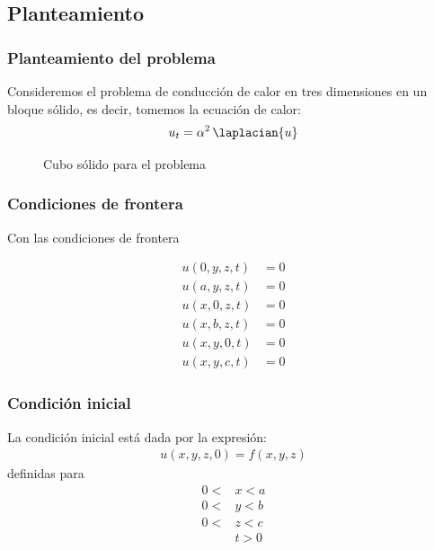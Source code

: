 \subsection{Planteamiento}
\begin{frame}
\frametitle{Planteamiento del problema}
Consideremos el problema de conducción de calor en tres dimensiones en un bloque sólido, es decir, tomemos la ecuación de calor:
\begin{align}
u_{t} = \alpha^{2} \, \laplacian{u}
\label{eq:ecuacion_02_214}
\end{align}
\begin{figure}
    \centering
    
    \caption{Cubo sólido para el problema}
\end{figure}
\end{frame}
\begin{frame}
\frametitle{Condiciones de frontera}
Con las condiciones de frontera
\\
\begin{minipage}{0.4\textwidth}
\begin{figure}
    \centering
    
\end{figure}
\end{minipage}
\hspace{1cm}
\begin{minipage}{0.4\textwidth}
\begin{align}
u(0, y, z, t) &= 0 \label{eq:ecuacion_0215} \\ 
u(a, y, z, t) &= 0 \label{eq:ecuacion_0216} \\ 
u(x, 0, z, t) &= 0 \label{eq:ecuacion_0217} \\
u(x, b, z, t) &= 0 \label{eq:ecuacion_0218} \\
u(x, y, 0, t) &= 0 \label{eq:ecuacion_0219} \\
u(x, y, c, t) &= 0 \label{eq:ecuacion_0220}
\end{align}
\end{minipage}
\end{frame}
\begin{frame}
\frametitle{Condición inicial}
La condición inicial está dada por la expresión:
\begin{align}
u(x, y, z, 0) = f(x, y, z)
\label{eq:ecuacion_02_221}
\end{align}
definidas para 
\begin{align*}
0 < &x < a \\[0.5em]
0 < &y < b \\[0.5em]
0 < &z < c \\[0.5em]
&t > 0
\end{align*}
\end{frame}
